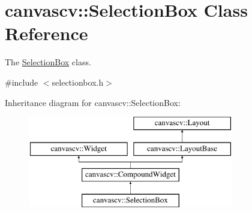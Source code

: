 \hypertarget{classcanvascv_1_1SelectionBox}{}\section{canvascv\+:\+:Selection\+Box Class Reference}
\label{classcanvascv_1_1SelectionBox}


The \hyperlink{classcanvascv_1_1SelectionBox}{Selection\+Box} class.  




{\ttfamily \#include $<$selectionbox.\+h$>$}

Inheritance diagram for canvascv\+:\+:Selection\+Box\+:\begin{figure}[H]
\begin{center}
\leavevmode
\includegraphics[height=4.000000cm]{classcanvascv_1_1SelectionBox}
\end{center}
\end{figure}
